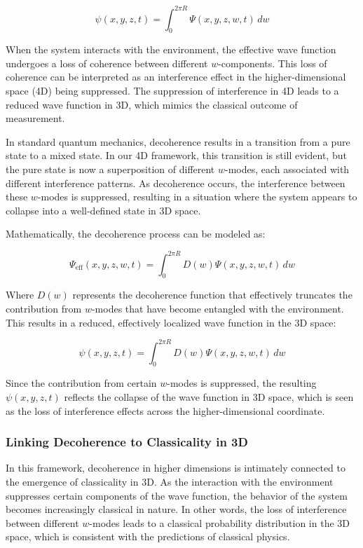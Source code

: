 \documentclass[12pt]{article}
\begin{document}
\begin{equation}
\psi(x, y, z, t) = \int_{0}^{2\pi R} \Psi(x, y, z, w, t) \, dw
\end{equation}

When the system interacts with the environment, the effective wave function undergoes a loss of coherence between different \( w \)-components. This loss of coherence can be interpreted as an interference effect in the higher-dimensional space (4D) being suppressed. The suppression of interference in 4D leads to a reduced wave function in 3D, which mimics the classical outcome of measurement.

In standard quantum mechanics, decoherence results in a transition from a pure state to a mixed state. In our 4D framework, this transition is still evident, but the pure state is now a superposition of different \( w \)-modes, each associated with different interference patterns. As decoherence occurs, the interference between these \( w \)-modes is suppressed, resulting in a situation where the system appears to collapse into a well-defined state in 3D space.

Mathematically, the decoherence process can be modeled as:

\begin{equation}
\Psi_{\text{eff}}(x, y, z, w, t) = \int_{0}^{2\pi R} D(w) \Psi(x, y, z, w, t) \, dw
\end{equation}

Where \( D(w) \) represents the decoherence function that effectively truncates the contribution from \( w \)-modes that have become entangled with the environment. This results in a reduced, effectively localized wave function in the 3D space:

\begin{equation}
\psi(x, y, z, t) = \int_{0}^{2\pi R} D(w) \Psi(x, y, z, w, t) \, dw
\end{equation}

Since the contribution from certain \( w \)-modes is suppressed, the resulting \( \psi(x, y, z, t) \) reflects the collapse of the wave function in 3D space, which is seen as the loss of interference effects across the higher-dimensional coordinate.

\subsubsection{Linking Decoherence to Classicality in 3D}

In this framework, decoherence in higher dimensions is intimately connected to the emergence of classicality in 3D. As the interaction with the environment suppresses certain components of the wave function, the behavior of the system becomes increasingly classical in nature. In other words, the loss of interference between different \( w \)-modes leads to a classical probability distribution in the 3D space, which is consistent with the predictions of classical physics.
\end{document}
